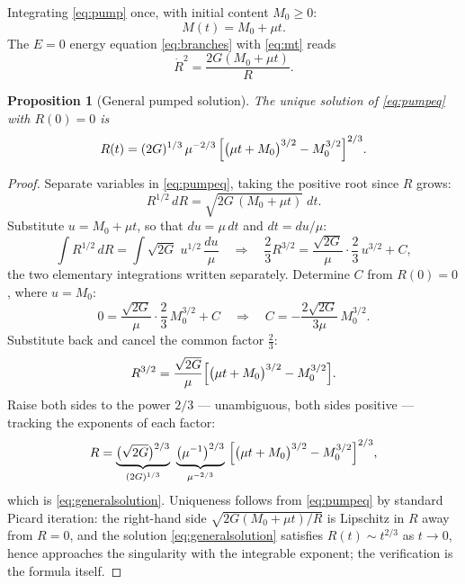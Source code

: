 \documentclass[11pt]{amsbook}
\theoremstyle{plain}
\newtheorem{proposition}[theorem]{Proposition}
\theoremstyle{definition}
\theoremstyle{remark}
\newcommand{\uses}[1]{\par\nopagebreak\noindent{\footnotesize\emph{Uses: #1.}\par}}
\begin{document}
Integrating \cref{eq:pump} once, with initial content $M_{0} \geq 0$:
\begin{equation}\label{eq:mt}
M(t) = M_{0} + \mu t.
\end{equation}
The $E = 0$ energy equation \cref{eq:branches} with \cref{eq:mt} reads
\begin{equation}\label{eq:pumpeq}
\dot R^{2} = \frac{2G (M_{0} + \mu t)}{R}.
\end{equation}

\begin{proposition}[General pumped solution]\label{prop:generalsolution}
The unique solution of \cref{eq:pumpeq} with $R(0) = 0$ is
\begin{equation}\label{eq:generalsolution}
R(t) = (2G)^{1/3}\,\mu^{-2/3}\,\Bigl[ \bigl(\mu t + M_{0}\bigr)^{3/2} - M_{0}^{3/2} \Bigr]^{2/3}.
\end{equation}
\uses{\cref{eq:pumpeq}, \cref{eq:pump}}
\end{proposition}

\begin{proof}
Separate variables in \cref{eq:pumpeq}, taking the positive root since $R$ grows:
\begin{equation}\label{eq:separate}
R^{1/2}\,dR = \sqrt{2G\,(M_{0} + \mu t)}\;dt.
\end{equation}
Substitute $u = M_{0} + \mu t$, so that $du = \mu\,dt$ and $dt = du/\mu$:
\begin{equation}\label{eq:usub}
\int R^{1/2}\,dR = \int \sqrt{2G}\;u^{1/2}\,\frac{du}{\mu}
\quad\Longrightarrow\quad
\frac{2}{3} R^{3/2} = \frac{\sqrt{2G}}{\mu}\cdot\frac{2}{3}\,u^{3/2} + C,
\end{equation}
the two elementary integrations written separately. Determine $C$ from $R(0) = 0$, where $u = M_{0}$:
\begin{equation}\label{eq:constant}
0 = \frac{\sqrt{2G}}{\mu}\cdot\frac{2}{3}\,M_{0}^{3/2} + C
\quad\Longrightarrow\quad
C = -\frac{2\sqrt{2G}}{3\mu}\,M_{0}^{3/2}.
\end{equation}
Substitute back and cancel the common factor $\tfrac23$:
\begin{equation}\label{eq:presolved}
R^{3/2} = \frac{\sqrt{2G}}{\mu}\Bigl[ \bigl(\mu t + M_{0}\bigr)^{3/2} - M_{0}^{3/2} \Bigr].
\end{equation}
Raise both sides to the power $2/3$ --- unambiguous, both sides positive --- tracking the exponents of each factor:
\begin{equation}\label{eq:raise}
R = \underbrace{\bigl(\sqrt{2G}\bigr)^{2/3}}_{(2G)^{1/3}}\ \underbrace{\bigl(\mu^{-1}\bigr)^{2/3}}_{\mu^{-2/3}}\ \Bigl[ \bigl(\mu t + M_{0}\bigr)^{3/2} - M_{0}^{3/2} \Bigr]^{2/3},
\end{equation}
which is \cref{eq:generalsolution}. Uniqueness follows from \cref{eq:pumpeq} by standard Picard iteration: the right-hand side $\sqrt{2G(M_{0}+\mu t)/R}$ is Lipschitz in $R$ away from $R = 0$, and the solution \cref{eq:generalsolution} satisfies $R(t) \sim t^{2/3}$ as $t \to 0$, hence approaches the singularity with the integrable exponent; the verification is the formula itself.
\end{proof}
\end{document}
